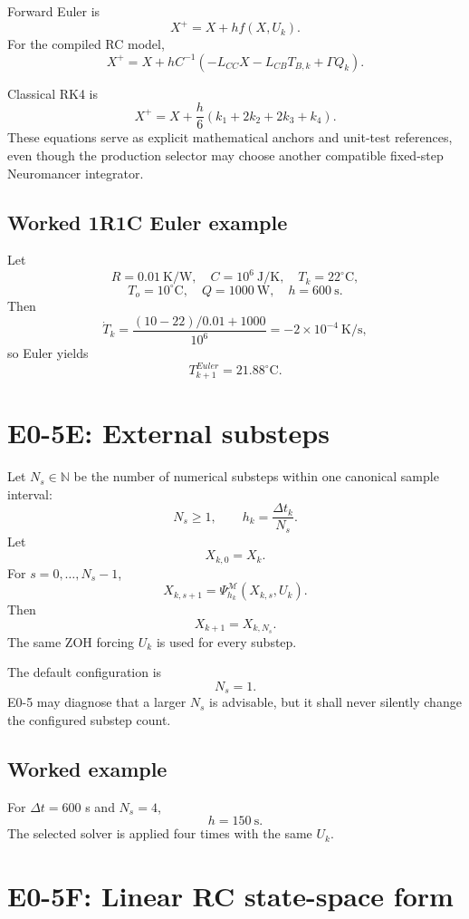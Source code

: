 \documentclass[11pt]{article}
\begin{document}
Forward Euler is
\[
\boxed{X^+=X+h f(X,U_k).}
\]
For the compiled RC model,
\[
\boxed{
X^+=X+hC^{-1}\left(-L_{CC}X-L_{CB}T_{B,k}+\Gamma Q_k\right).
}
\]

Classical RK4 is
\[
\boxed{
X^+
=X+\frac{h}{6}(k_1+2k_2+2k_3+k_4).
}
\]
These equations serve as explicit mathematical anchors and unit-test references,
even though the production selector may choose another compatible fixed-step
Neuromancer integrator.

\subsection*{Worked 1R1C Euler example}
Let
\[
R=0.01\ \mathrm{K/W},\quad C=10^6\ \mathrm{J/K},\quad
T_k=22^\circ\mathrm C,
\]
\[
T_o=10^\circ\mathrm C,\quad Q=1000\ \mathrm W,\quad h=600\ \mathrm s.
\]
Then
\[
\dot T_k
=
\frac{(10-22)/0.01+1000}{10^6}
=-2\times10^{-4}\ \mathrm{K/s},
\]
so Euler yields
\[
\boxed{T_{k+1}^{Euler}=21.88^\circ\mathrm C.}
\]

\section{E0-5E: External substeps}

Let $N_s\in\mathbb N$ be the number of numerical substeps within one canonical
sample interval:
\[
\boxed{N_s\ge1,\qquad h_k=\frac{\Delta t_k}{N_s}.}
\]
Let
\[
X_{k,0}=X_k.
\]
For $s=0,\ldots,N_s-1$,
\[
\boxed{
X_{k,s+1}=\Psi_{h_k}^{\mathcal M}(X_{k,s},U_k).
}
\]
Then
\[
\boxed{X_{k+1}=X_{k,N_s}.}
\]
The same ZOH forcing $U_k$ is used for every substep.

The default configuration is
\[
\boxed{N_s=1.}
\]
E0-5 may diagnose that a larger $N_s$ is advisable, but it shall never silently
change the configured substep count.

\subsection*{Worked example}
For $\Delta t=600$ s and $N_s=4$,
\[
h=150\ \mathrm s.
\]
The selected solver is applied four times with the same $U_k$.

\section{E0-5F: Linear RC state-space form}
\end{document}
